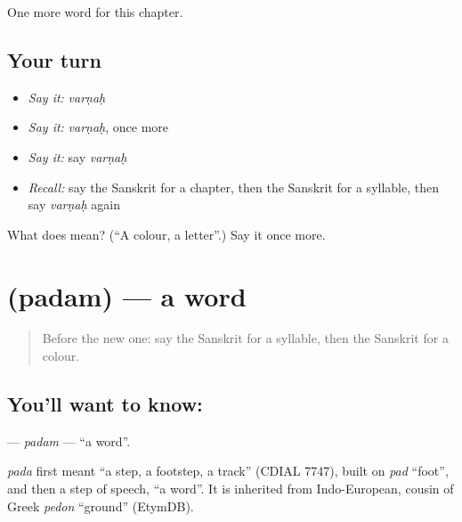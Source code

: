 \begin{grammarlens}[title={What you've built}]
One more word for this chapter.
\end{grammarlens}

\subsection*{Your turn}
\begin{itemize}
\raggedright
  \item \emph{Say it:} \emph{varṇaḥ}
  \item \emph{Say it:} \emph{varṇaḥ}, once more
  \item \emph{Say it:} say \emph{varṇaḥ}
  \item \emph{Recall:} say the Sanskrit for a chapter, then the Sanskrit for a syllable, then say \emph{varṇaḥ} again
\end{itemize}

\begin{tcolorbox}[breakable,colback=teal!4,colframe=teal!35!black,title={Before you move on}]
What does  mean? (\textquotedblleft{}A colour, a letter\textquotedblright{}.) Say it once more.
\end{tcolorbox}
\section[\texorpdfstring{\sk{पदम्} (padam)}{पदम् (padam)}]{ (padam) — a word}

\label{lesson:SA-C168-padam}



\begin{quote}
Before the new one: say the Sanskrit for a syllable, then the Sanskrit for a colour.
\end{quote}

\subsection*{You'll want to know: }
\textbf{} — \emph{padam} — \textquotedblleft{}a word\textquotedblright{}.

\begin{cousinweb}
\emph{pada} first meant \textquotedblleft{}a step, a footstep, a track\textquotedblright{} (CDIAL 7747), built on \emph{pad} \textquotedblleft{}foot\textquotedblright{}, and then a step of speech, \textquotedblleft{}a word\textquotedblright{}. It is inherited from Indo-European, cousin of Greek \emph{pedon} \textquotedblleft{}ground\textquotedblright{} (EtymDB).
\end{cousinweb}


